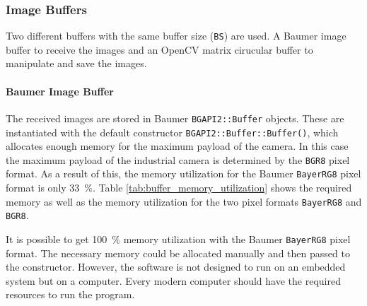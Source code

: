 \subsubsection{Image Buffers}
\label{subsubsec:buffers}

Two different buffers with the same buffer size (\texttt{BS}) are used.
A Baumer image buffer to receive the images and an OpenCV matrix cirucular buffer to manipulate and save the images.

\paragraph{Baumer Image Buffer}
The received images are stored in Baumer \texttt{BGAPI2::Buffer} objects.
These are instantiated with the default constructor \texttt{BGAPI2::Buffer::Buffer()}, which allocates enough memory for the maximum payload of the camera.
In this case the maximum payload of the industrial camera is determined by the \texttt{BGR8} pixel format.
As a result of this, the memory utilization for the Baumer \texttt{BayerRG8} pixel format is only \SI{33}{\percent}.
Table \ref{tab:buffer_memory_utilization} shows the required memory as well as the memory utilization for the two pixel formats \texttt{BayerRG8} and \texttt{BGR8}.

It is possible to get \SI{100}{\percent} memory utilization with the Baumer \texttt{BayerRG8} pixel format.
The necessary memory could be allocated manually and then passed to the constructor.
However, the software is not designed to run on an embedded system but on a computer.
Every modern computer should have the required resources to run the program.


